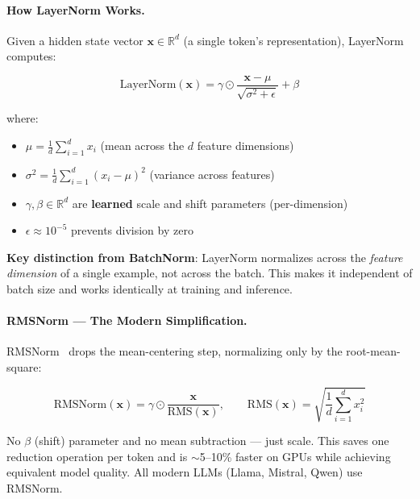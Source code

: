 \paragraph{How LayerNorm Works.}
\label{how-layernorm-works.}

Given a hidden state vector $\mathbf{x} \in \mathbb{R}^d$ (a single token’s representation), LayerNorm~\cite{ba2016layernorm} computes:

\begin{equation}
\text{LayerNorm}(\mathbf{x}) = \gamma \odot \frac{\mathbf{x} - \mu}{\sqrt{\sigma^2 + \epsilon}} + \beta
\end{equation}

where:

\begin{itemize}
  \item $\mu = \frac{1}{d}\sum_{i=1}^{d} x_i$ (mean across the $d$ feature dimensions)
  \item $\sigma^2 = \frac{1}{d}\sum_{i=1}^{d} (x_i - \mu)^2$ (variance across features)
  \item $\gamma, \beta \in \mathbb{R}^d$ are \textbf{learned} scale and shift parameters (per-dimension)
  \item $\epsilon \approx 10^{-5}$ prevents division by zero
\end{itemize}

\textbf{Key distinction from BatchNorm}: LayerNorm normalizes across the \emph{feature dimension} of a single example, not across the batch. This makes it independent of batch size and works identically at training and inference.

\paragraph{RMSNorm --- The Modern Simplification.}
\label{rmsnorm-the-modern-simplification.}

RMSNorm~\cite{zhang2019rmsnorm} drops the mean-centering step, normalizing only by the root-mean-square:

\begin{equation}
\text{RMSNorm}(\mathbf{x}) = \gamma \odot \frac{\mathbf{x}}{\text{RMS}(\mathbf{x})}, \qquad \text{RMS}(\mathbf{x}) = \sqrt{\frac{1}{d}\sum_{i=1}^{d} x_i^2}
\end{equation}

No $\beta$ (shift) parameter and no mean subtraction --- just scale. This saves one reduction operation per token and is $\sim$5--10\% faster on GPUs while achieving equivalent model quality. All modern LLMs (Llama, Mistral, Qwen) use RMSNorm.

